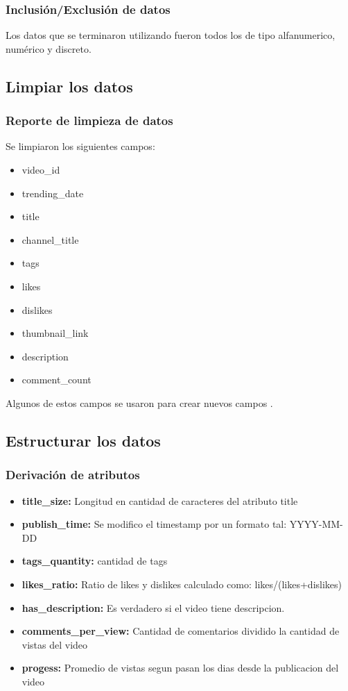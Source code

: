     \subsubsection{Inclusión/Exclusión de datos}
        Los datos que se terminaron utilizando fueron todos los de tipo
        alfanumerico, numérico y discreto.

\subsection{Limpiar los datos}
    \subsubsection{Reporte de limpieza de datos}
        Se limpiaron los siguientes campos:
        \begin{itemize}
            \item video\_id
            \item trending\_date
            \item title
            \item channel\_title
            \item tags
            \item likes
            \item dislikes
            \item thumbnail\_link
            \item description
            \item comment\_count
        \end{itemize}
        Algunos de estos campos se usaron para crear nuevos campos
        .
\subsection{Estructurar los datos}
    \subsubsection{Derivación de atributos}
        \begin{itemize}
            \item \textbf{title\_size:} Longitud en cantidad de caracteres del atributo title
            \item \textbf{publish\_time:} Se modifico el timestamp por un formato tal: YYYY-MM-DD
            \item \textbf{tags\_quantity:} cantidad de tags
            \item \textbf{likes\_ratio:} Ratio de likes y dislikes calculado como: likes/(likes+dislikes)
            \item \textbf{has\_description:} Es verdadero si el video tiene descripcion.
            \item \textbf{comments\_per\_view:} Cantidad de comentarios dividido la cantidad de vistas del video
            \item \textbf{progess:} Promedio de vistas segun pasan los dias desde la publicacion del video
        \end{itemize}
